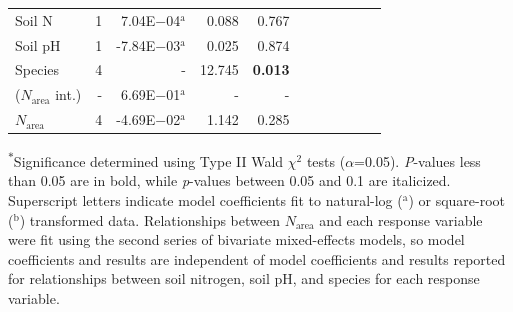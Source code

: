 \begin{landscape}
\begin{table}
{\begin{tabular}{p{2.5cm}p{0.5cm}p{2cm}p{1.5cm}p{1.5cm}p{2cm}p{1.5cm}p{1.5cm}p{2cm}p{1.5cm}p{1.5cm}}
            Soil N & \multicolumn{1}{r}{1}
            & \multicolumn{1}{r}{7.04E$-$04$^\mathrm{a}$}  & \multicolumn{1}{r}{0.088} & \multicolumn{1}{r}{0.767}
            &&&&&& 
            \\

            Soil pH & \multicolumn{1}{r}{1}
            & \multicolumn{1}{r}{-7.84E$-$03$^\mathrm{a}$} & \multicolumn{1}{r}{0.025} & \multicolumn{1}{r}{0.874}
            &&&&&& 
            \\

            Species & \multicolumn{1}{r}{4}
            & \multicolumn{1}{r}{-} & \multicolumn{1}{r}{12.745} & \multicolumn{1}{r}{\textbf{0.013}} \\
            \hline

            ($N_\mathrm{area}$ int.) & \multicolumn{1}{r}{-}
            & \multicolumn{1}{r}{6.69E$-$01$^\mathrm{a}$} & \multicolumn{1}{r}{-} & \multicolumn{1}{r}{-}
            &&&&&& 
            \\

            $N_\mathrm{area}$ & \multicolumn{1}{r}{4}
            & \multicolumn{1}{r}{-4.69E$-$02$^\mathrm{a}$} & \multicolumn{1}{r}{1.142} & \multicolumn{1}{r}{0.285}
            &&&&& \\
            \hline
        \end{tabular}}
        \label{tab:table3.2}
    \end{table}
\begin{singlespace}
    \noindent \textsuperscript{$*$}Significance determined using Type II Wald $\chi^{2}$ tests ($\alpha$=0.05). \textit{P}-values less than 0.05 are in bold, while \textit{p}-values between 0.05 and 0.1 are italicized. Superscript letters indicate model coefficients fit to natural-log ($^\mathrm{a}$) or square-root ($^\mathrm{b}$) transformed data. Relationships between $N_\mathrm{area}$ and each response variable were fit using the second series of bivariate mixed-effects models, so model coefficients and results are independent of model coefficients and results reported for relationships between soil nitrogen, soil pH, and species for each response variable.
\end{singlespace}
\end{landscape}
\clearpage

